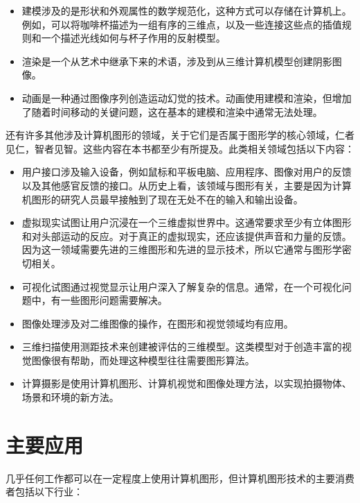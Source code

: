 \documentclass[lang=cn,12pt]{elegantbook}
\begin{document}
\begin{itemize}
\item 建模涉及的是形状和外观属性的数学规范化，这种方式可以存储在计算机上。例如，可以将咖啡杯描述为一组有序的三维点，以及一些连接这些点的插值规则和一个描述光线如何与杯子作用的反射模型。
\item 渲染是一个从艺术中继承下来的术语，涉及到从三维计算机模型创建阴影图像。
\item 动画是一种通过图像序列创造运动幻觉的技术。动画使用建模和渲染，但增加了随着时间移动的关键问题，这在基本的建模和渲染中通常无法处理。
\end{itemize}

还有许多其他涉及计算机图形的领域，关于它们是否属于图形学的核心领域，仁者见仁，智者见智。这些内容在本书都至少有所提及。此类相关领域包括以下内容：
\begin{itemize}
\item 用户接口涉及输入设备，例如鼠标和平板电脑、应用程序、图像对用户的反馈以及其他感官反馈的接口。从历史上看，该领域与图形有关，主要是因为计算机图形的研究人员最早接触到了现在无处不在的输入和输出设备。
\item 虚拟现实试图让用户沉浸在一个三维虚拟世界中。这通常要求至少有立体图形和对头部运动的反应。对于真正的虚拟现实，还应该提供声音和力量的反馈。因为这一领域需要先进的三维图形和先进的显示技术，所以它通常与图形学密切相关。
\item 可视化试图通过视觉显示让用户深入了解复杂的信息。通常，在一个可视化问题中，有一些图形问题需要解决。
\item 图像处理涉及对二维图像的操作，在图形和视觉领域均有应用。
\item 三维扫描使用测距技术来创建被评估的三维模型。这类模型对于创造丰富的视觉图像很有帮助，而处理这种模型往往需要图形算法。
\item 计算摄影是使用计算机图形、计算机视觉和图像处理方法，以实现拍摄物体、场景和环境的新方法。
\end{itemize}

\section{主要应用}

几乎任何工作都可以在一定程度上使用计算机图形，但计算机图形技术的主要消费者包括以下行业：
\end{document}
